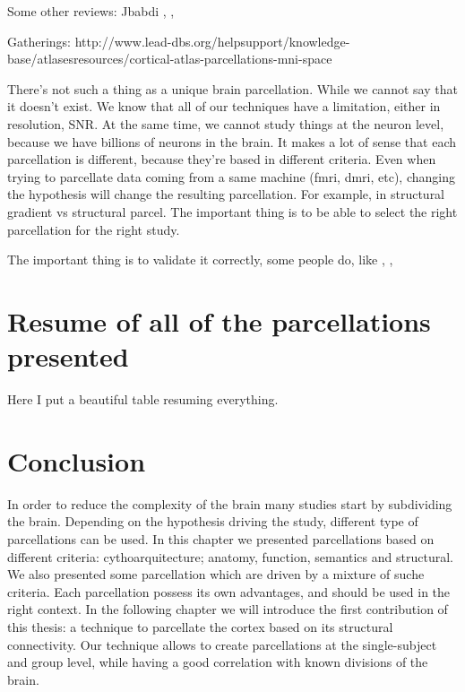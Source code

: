 Some other reviews: Jbabdi \cite{Jbabdi2013}, \cite{Arslan2018}, 

Gatherings: http://www.lead-dbs.org/helpsupport/knowledge-base/atlasesresources/cortical-atlas-parcellations-mni-space


There's not such a thing as a unique brain parcellation. While we cannot say
that it doesn't exist. We know that all of our techniques have a limitation,
either in resolution, SNR. At the same time, we cannot study things at the
neuron level, because we have billions of neurons in the brain. It makes a
lot of sense that each parcellation is different, because they're based
in different criteria. Even when trying to parcellate data coming from a
same machine (fmri, dmri, etc), changing the hypothesis will change the 
resulting parcellation. For example, in structural gradient vs structural
parcel. The important thing is to be able to select the right parcellation
for the right study.

The important thing is to validate it correctly, some people do, like \cite{Gallardo}, \cite{Auzias2016}, \cite{ThiebautdeSchotten2014, ThiebautdeSchotten2016}

\section{Resume of all of the parcellations presented}
Here I put a beautiful table resuming everything.

\section{Conclusion}
In order to reduce the complexity of the brain many studies start by subdividing
the brain. Depending on the hypothesis driving the study, different type
of parcellations can be used. In this chapter we presented parcellations based
on different criteria: cythoarquitecture; anatomy, function, semantics and
structural. We also presented some parcellation which are driven by a mixture
of suche criteria. Each parcellation possess its own advantages, and should be
used in the right context. In the following chapter we will introduce the
first contribution of this thesis: a technique to parcellate the cortex based
on its structural connectivity. Our technique allows to create parcellations
at the single-subject and group level, while having a good correlation with
known divisions of the brain.


\chapterbib
